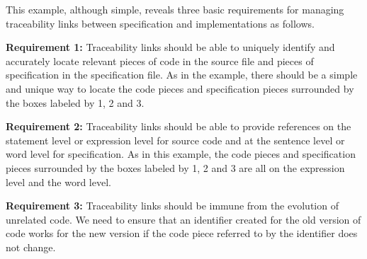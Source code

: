 This example, although simple, reveals three basic requirements for managing traceability links between specification and implementations as follows.

\smallskip
\noindent 
\textbf{Requirement 1:} Traceability links should be able to uniquely identify and accurately locate relevant pieces of code in the source file and pieces of specification in the specification file. As in the example, there should be a simple and unique way to locate the code pieces and specification pieces surrounded by the boxes labeled by 1, 2 and 3.

\smallskip
\noindent
\textbf{Requirement 2:} Traceability links should be able to provide references on the statement level or expression level for source code and at the sentence level or word level for specification. As in this example, the code pieces and specification pieces surrounded by the boxes labeled by 1, 2 and 3 are all on the expression level and the word level.

\smallskip
\noindent
\textbf{Requirement 3:} Traceability links should be immune from the evolution of unrelated code. We need to ensure that an identifier created for the old version of code works for the new version if the code piece referred to by the identifier does not change.

